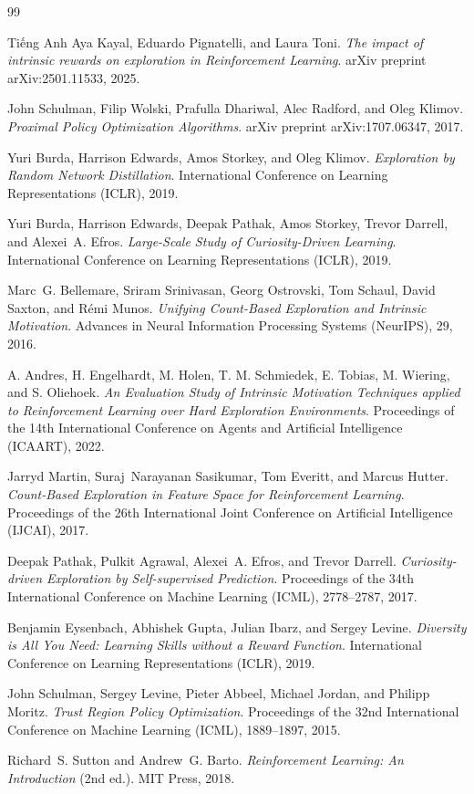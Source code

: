 \documentclass{uetgraduation}
\begin{document}
\begin{thebibliography}{99}
\begin{bibsection}{Tiếng Anh}
Aya Kayal, Eduardo Pignatelli, and Laura Toni.
\textit{The impact of intrinsic rewards on exploration in Reinforcement Learning}.
arXiv preprint arXiv:2501.11533, 2025.

John Schulman, Filip Wolski, Prafulla Dhariwal, Alec Radford, and Oleg Klimov.
\textit{Proximal Policy Optimization Algorithms}.
arXiv preprint arXiv:1707.06347, 2017.

Yuri Burda, Harrison Edwards, Amos Storkey, and Oleg Klimov.
\textit{Exploration by Random Network Distillation}.
International Conference on Learning Representations (ICLR), 2019.

Yuri Burda, Harrison Edwards, Deepak Pathak, Amos Storkey, Trevor Darrell, and Alexei~A. Efros.
\textit{Large-Scale Study of Curiosity-Driven Learning}.
International Conference on Learning Representations (ICLR), 2019.

Marc~G. Bellemare, Sriram Srinivasan, Georg Ostrovski, Tom Schaul, David Saxton, and Rémi Munos.
\textit{Unifying Count-Based Exploration and Intrinsic Motivation}.
Advances in Neural Information Processing Systems (NeurIPS), 29, 2016.

A. Andres, H. Engelhardt, M. Holen, T. M. Schmiedek, E. Tobias, M. Wiering, and S. Oliehoek.
\textit{An Evaluation Study of Intrinsic Motivation Techniques applied to Reinforcement Learning over Hard Exploration Environments}.
Proceedings of the 14th International Conference on Agents and Artificial Intelligence (ICAART), 2022.

Jarryd Martin, Suraj~Narayanan Sasikumar, Tom Everitt, and Marcus Hutter.
\textit{Count-Based Exploration in Feature Space for Reinforcement Learning}.
Proceedings of the 26th International Joint Conference on Artificial Intelligence (IJCAI), 2017.

Deepak Pathak, Pulkit Agrawal, Alexei~A. Efros, and Trevor Darrell.
\textit{Curiosity-driven Exploration by Self-supervised Prediction}.
Proceedings of the 34th International Conference on Machine Learning (ICML), 2778--2787, 2017.

Benjamin Eysenbach, Abhishek Gupta, Julian Ibarz, and Sergey Levine.
\textit{Diversity is All You Need: Learning Skills without a Reward Function}.
International Conference on Learning Representations (ICLR), 2019.

John Schulman, Sergey Levine, Pieter Abbeel, Michael Jordan, and Philipp Moritz.
\textit{Trust Region Policy Optimization}.
Proceedings of the 32nd International Conference on Machine Learning (ICML), 1889--1897, 2015.

Richard~S. Sutton and Andrew~G. Barto.
\textit{Reinforcement Learning: An Introduction} (2nd ed.).
MIT Press, 2018.
\end{bibsection}
\end{thebibliography}
\end{document}

